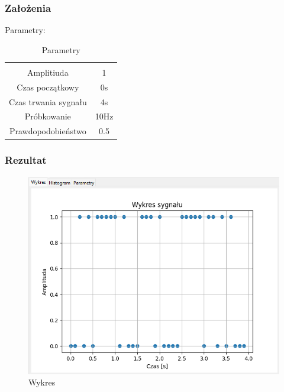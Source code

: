 \documentclass{article}
\begin{document}
\subsubsection{Założenia}
\noindent
Parametry:
\begin{table}[h!]
    \centering
    \vspace{0.2cm}
    \begin{tabular}{|c|c|}
        \hline\hline\\[-0.4cm]
        Amplitiuda & 1  \\
        \hline
        Czas początkowy & 0s  \\
        \hline
        Czas trwania sygnału & 4s  \\
        \hline
        Próbkowanie & 10Hz \\
        \hline
        Prawdopodobieństwo & 0.5\\
        \hline
    \end{tabular}
    \caption{Parametry}
    \label{szumimpuls}
\end{table}
\FloatBarrier
\subsubsection{Rezultat}
\begin{figure}[h!]
    \centering
    \includegraphics[width=\textwidth]{img/szum-impuls/wykres.png}
    \caption{Wykres}
\end{figure}
\end{document}
